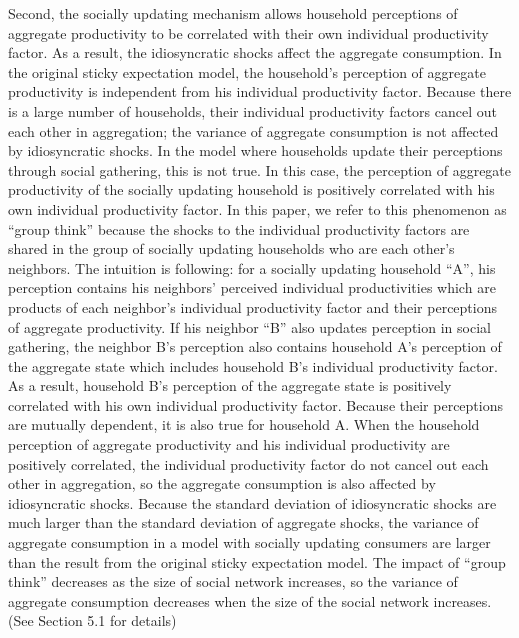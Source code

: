 \documentclass[12pt,letterpaper]{article}
\begin{document}
Second, the socially updating mechanism allows household perceptions of aggregate productivity to be correlated with their own individual productivity factor. As a result, the idiosyncratic shocks affect the aggregate consumption. In the original sticky expectation model, the household's perception of aggregate productivity is independent from his individual productivity factor. Because there is a large number of households, their individual productivity factors cancel out each other in aggregation; the variance of aggregate consumption is not affected by idiosyncratic shocks. In the model where households update their perceptions through social gathering, this is not true. In this case, the perception of aggregate productivity of the socially updating household is positively correlated with his own individual productivity factor. In this paper, we refer to this phenomenon as ``group think'' because the shocks to the individual productivity factors are shared in the group of socially updating households who are each other's neighbors. The intuition is following: for a socially updating household ``A'', his perception contains his neighbors' perceived individual productivities which are products of each neighbor's individual productivity factor and their perceptions of aggregate productivity. If his neighbor ``B'' also updates perception in social gathering, the neighbor B's perception also contains household A's perception of the aggregate state which includes household B's individual productivity factor. As a result, household B's perception of the aggregate state is positively correlated with his own individual productivity factor. Because their perceptions are mutually dependent, it is also true for household A. When the household perception of aggregate productivity and his individual productivity are positively correlated, the individual productivity factor do not cancel out each other in aggregation, so the aggregate consumption is also affected by idiosyncratic shocks. Because the standard deviation of idiosyncratic shocks are much larger than the standard deviation of aggregate shocks, the variance of aggregate consumption in a model with socially updating consumers are larger than the result from the original sticky expectation model. The impact of ``group think'' decreases as the size of social network increases, so the variance of aggregate consumption decreases when the size of the social network increases.(See Section 5.1 for details)\par
\end{document}
